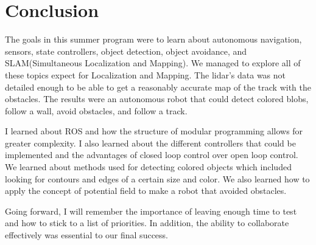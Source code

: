 \documentclass[journal, a4paper]{IEEEtran}
\begin{document}
\section{Conclusion}
\par The goals in this summer program were to learn about autonomous navigation, sensors, state controllers, object detection, object avoidance, and SLAM(Simultaneous Localization and Mapping). We managed to explore all of these topics expect for Localization and Mapping. The lidar's data was not detailed enough to be able to get a reasonably accurate map of the track with the obstacles. The results were an autonomous robot that could detect colored blobs, follow a wall, avoid obstacles, and follow a track. 
\par I learned about ROS and how the structure of modular programming allows for greater complexity. I also learned about the different controllers that could be implemented and the advantages of closed loop control over open loop control. We learned about methods used for detecting colored objects which included looking for contours and edges of a certain size and color. We also learned how to apply the concept of potential field to make a robot that avoided obstacles. 

\par Going forward, I will remember the importance of leaving enough time to test and how to stick to a list of priorities. In addition, the ability to collaborate effectively was essential to our final success. 

\nocite{5}



\end{document}
